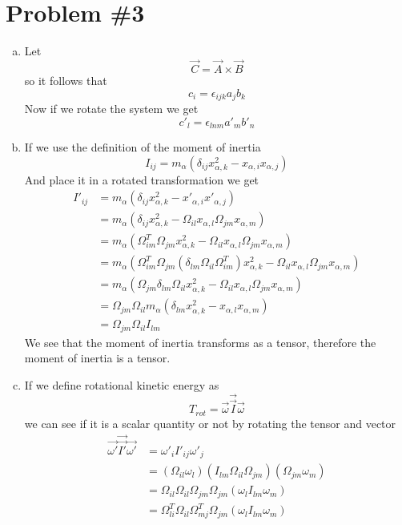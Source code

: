\documentclass[11pt]{article}
\numberwithin{equation}{section}
\begin{document}
\section{Problem \#3}
\begin{enumerate}[(a)]
\item
Let
$$\vec{C} = \vec{A}\times\vec{B}$$
so it follows that
$$c_i = \epsilon_{ijk}a_jb_k$$
Now if we rotate the system we get
$$c'_l = \epsilon_{lnm}a'_mb'_n$$

\item
If we use the definition of the moment of inertia 
$$I_{ij} = m_{\alpha}\left(\delta_{ij}x^2_{\alpha,k}-x_{\alpha,i}x_{\alpha,j}\right)$$
And place it in a rotated transformation we get
\begin{align*}
I'_{ij} &= m_{\alpha}\left(\delta_{ij}x^2_{\alpha,k}-x'_{\alpha,i}x'_{\alpha,j}\right)\\
&= m_{\alpha}\left(\delta_{ij}x^2_{\alpha,k}-\Omega_{il}x_{\alpha,l}\Omega_{jm}x_{\alpha,m}\right)\\
&= m_{\alpha}\left(\Omega^T_{im}\Omega_{jm}x^2_{\alpha,k}-\Omega_{il}x_{\alpha,l}\Omega_{jm}x_{\alpha,m}\right)\\
&= m_{\alpha}\left(\Omega^T_{im}\Omega_{jm}(\delta_{lm}\Omega_{il}\Omega^T_{im})x^2_{\alpha,k}-\Omega_{il}x_{\alpha,l}\Omega_{jm}x_{\alpha,m}\right)\\
&= m_{\alpha}\left(\Omega_{jm}\delta_{lm}\Omega_{il}x^2_{\alpha,k}-\Omega_{il}x_{\alpha,l}\Omega_{jm}x_{\alpha,m}\right)\\
&= \Omega_{jm}\Omega_{il}m_{\alpha}\left(\delta_{lm}x^2_{\alpha,k}-x_{\alpha,l}x_{\alpha,m}\right)\\
&= \Omega_{jm}\Omega_{il}I_{lm}
\end{align*}
We see that the moment of inertia transforms as a tensor, therefore the moment of inertia is a tensor.
\item
If we define rotational kinetic energy as
$$T_{rot} = \vec{\omega}\vec{\vec{I}}\vec{\omega}$$
we can see if it is a scalar quantity or not by rotating the tensor and vector
\begin{align*}
\vec{\omega'}\vec{\vec{I'}}\vec{\omega'} &= \omega'_iI'_{ij}\omega'_j\\
&= (\Omega_{il}\omega_l)(I_{lm}\Omega_{il}\Omega_{jm})(\Omega_{jm}\omega_m)\\
&= \Omega_{il}\Omega_{il}\Omega_{jm}\Omega_{jm}(\omega_lI_{lm}\omega_m)\\
&= \Omega^T_{li}\Omega_{il}\Omega^T_{mj}\Omega_{jm}(\omega_lI_{lm}\omega_m)\\

\end{align*}
\end{enumerate}
\end{document}
